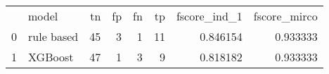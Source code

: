 \begin{tabular}{llrrrrrr}
 & model & tn & fp & fn & tp & fscore_ind_1 & fscore_mirco \\
0 & rule based & 45 & 3 & 1 & 11 & 0.846154 & 0.933333 \\
1 & XGBoost & 47 & 1 & 3 & 9 & 0.818182 & 0.933333 \\
\end{tabular}
